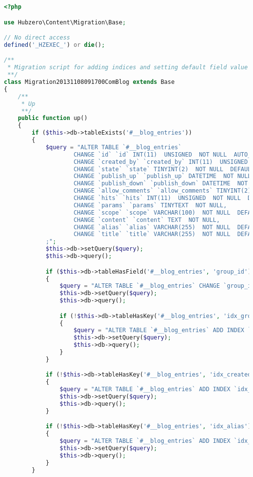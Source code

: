 \documentclass[10pt,letterpaper,titlepage]{article}
\begin{document}
\begin{lstlisting}[caption={\texttt{Migration20131108091700ComBlog.php} - an example of a properly formed Migration},language=PHP,label=migrationexample]
<?php

use Hubzero\Content\Migration\Base;

// No direct access
defined('_HZEXEC_') or die();

/**
 * Migration script for adding indices and setting default field value
 **/
class Migration20131108091700ComBlog extends Base
{
	/**
	 * Up
	 **/
	public function up()
	{
		if ($this->db->tableExists('#__blog_entries'))
		{
			$query = "ALTER TABLE `#__blog_entries`
					CHANGE `id` `id` INT(11)  UNSIGNED  NOT NULL  AUTO_INCREMENT,
					CHANGE `created_by` `created_by` INT(11)  UNSIGNED  NOT NULL  DEFAULT '0',
					CHANGE `state` `state` TINYINT(2)  NOT NULL  DEFAULT '0',
					CHANGE `publish_up` `publish_up` DATETIME  NOT NULL  DEFAULT '0000-00-00 00:00:00',
					CHANGE `publish_down` `publish_down` DATETIME  NOT NULL  DEFAULT '0000-00-00 00:00:00',
					CHANGE `allow_comments` `allow_comments` TINYINT(2)  NOT NULL  DEFAULT '0',
					CHANGE `hits` `hits` INT(11)  UNSIGNED  NOT NULL  DEFAULT '0',
					CHANGE `params` `params` TINYTEXT  NOT NULL,
					CHANGE `scope` `scope` VARCHAR(100)  NOT NULL  DEFAULT '',
					CHANGE `content` `content` TEXT  NOT NULL,
					CHANGE `alias` `alias` VARCHAR(255)  NOT NULL  DEFAULT '',
					CHANGE `title` `title` VARCHAR(255)  NOT NULL  DEFAULT ''
			;";
			$this->db->setQuery($query);
			$this->db->query();

			if ($this->db->tableHasField('#__blog_entries', 'group_id'))
			{
				$query = "ALTER TABLE `#__blog_entries` CHANGE `group_id` `group_id` INT(11)  NOT NULL  DEFAULT '0';";
				$this->db->setQuery($query);
				$this->db->query();

				if (!$this->db->tableHasKey('#__blog_entries', 'idx_group_id'))
				{
					$query = "ALTER TABLE `#__blog_entries` ADD INDEX `idx_group_id` (`group_id`);";
					$this->db->setQuery($query);
					$this->db->query();
				}
			}

			if (!$this->db->tableHasKey('#__blog_entries', 'idx_created_by'))
			{
				$query = "ALTER TABLE `#__blog_entries` ADD INDEX `idx_created_by` (`created_by`);";
				$this->db->setQuery($query);
				$this->db->query();
			}

			if (!$this->db->tableHasKey('#__blog_entries', 'idx_alias'))
			{
				$query = "ALTER TABLE `#__blog_entries` ADD INDEX `idx_alias` (`alias`);";
				$this->db->setQuery($query);
				$this->db->query();
			}
		}


\end{lstlisting}
\end{document}
